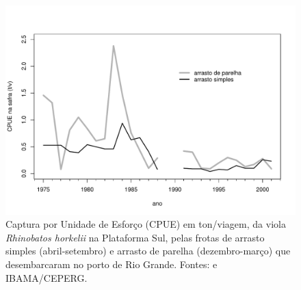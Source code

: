 \documentclass[a4paper,11pt,twoside,showtrims,onecolumn,openright,final]{memoir}
\begin{document}
\begin{figure}
\begin{center}
\includegraphics[width=\textwidth]{CPUESAFRAVIOLA}
\end{center}
\caption[Captura por Unidade de Esforço (CPUE) em ton/viagem, 
	 da viola \emph{Rhinobatos horkelii} na Plataforma Sul, 
	 pelas frotas de arrasto simples e arrasto de parelha de Rio Grande]
	{Captura por Unidade de Esforço (CPUE) em ton/viagem, 
	 da viola \emph{Rhinobatos horkelii} na Plataforma Sul, 
	 pelas frotas de arrasto simples (abril-setembro) e arrasto de parelha (dezembro-março)
	 que desembarcaram no porto de Rio Grande. Fontes: \citet{miranda2003} e IBAMA/CEPERG.}
\label{fig:viola-cpuesafra-1975a2002}
\end{figure}


%
%
\end{document}
